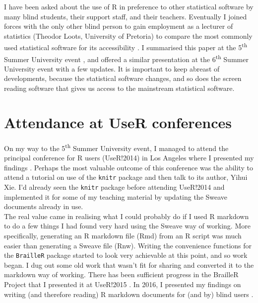 \documentclass[
]{book}
\begin{document}
I have been asked about the use of R in preference to other statistical software by many blind students, their support staff, and their teachers.
Eventually I joined forces with the only other blind person to gain employment as a lecturer of statistics (Theodor Loots, University of Pretoria) to compare the most commonly used statistical software for its accessibility \citep{GodfreyLoots2014JSS}.
I summarised this paper at the 5\textsuperscript{th} Summer University event \citep{Godfrey2014SU-StatsSoft}, and offered a similar presentation at the 6\textsuperscript{th} Summer University event \citep{Godfrey2016SU-StatsSoft} with a few updates.
It is important to keep abreast of developments, because the statistical software changes, and so does the screen reading software that gives us access to the mainstream statistical software.

\hypertarget{attendance-at-user-conferences}{%
\section{Attendance at UseR conferences}\label{attendance-at-user-conferences}}

On my way to the 5\textsuperscript{th} Summer University event, I managed to attend the principal conference for R users (UseR!2014) in Los Angeles where I presented my findings \citep{Godfrey2014BlindUseROral}.
Perhaps the most valuable outcome of this conference was the ability to attend a tutorial on use of the \texttt{knitr} package \citep{Rpkg-knitr} and then talk to its author, Yihui Xie.
I'd already seen the \texttt{knitr} package before attending UseR!2014 and implemented it for some of my teaching material by updating the Sweave documents already in use.\\
The real value came in realising what I could probably do if I used R markdown to do a few things I had found very hard using the Sweave way of working.
More specifically, generating an R markdown file (Rmd) from an R script was much easier than generating a Sweave file (Rnw).
Writing the convenience functions for the \texttt{BrailleR} package started to look very achievable at this point, and so work began.
I dug out some old work that wasn't fit for sharing and converted it to the markdown way of working.
There has been sufficient progress in the BrailleR Project that I presented it at UseR!2015 \citep{Godfrey2015BaseRWeepsOral}. In 2016, I presented my findings on writing (and therefore reading) R markdown documents for (and by) blind users \citep{GodfreyBilton2016UseROral}.
\end{document}
